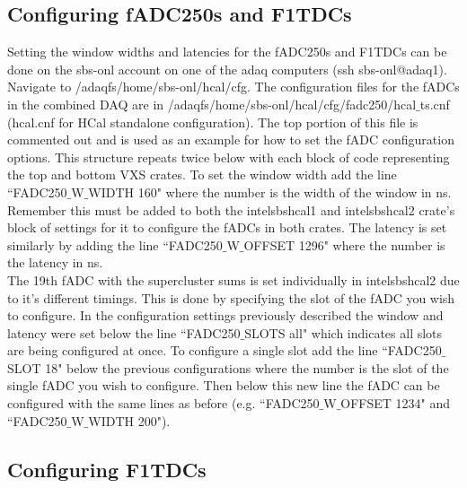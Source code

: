 \documentclass[oneside]{book}   %
\begin{document}
\subsection{Configuring fADC250s and F1TDCs}
\label{ssec:fadc_cfg}

Setting the window widths and latencies for the fADC250s and F1TDCs can be done on the sbs-onl account on one of the adaq computers (ssh sbs-onl@adaq1). Navigate to /adaqfs/home/sbs-onl/hcal/cfg. The configuration files for the fADCs in the combined DAQ are in /adaqfs/home/sbs-onl/hcal/cfg/fadc250/hcal$\_$ts.cnf (hcal.cnf for HCal standalone configuration). The top portion of this file is commented out and is used as an example for how to set the fADC configuration options. This structure repeats twice below with each block of code representing the top and bottom VXS crates. To set the window width add the line ``FADC250$\_$W$\_$WIDTH 160" where the number is the width of the window in ns. Remember this must be added to both the intelsbshcal1 and intelsbshcal2 crate's block of settings for it to configure the fADCs in both crates. The latency is set similarly by adding the line ``FADC250$\_$W$\_$OFFSET 1296" where the number is the latency in ns. \\

The 19th fADC with the supercluster sums is set individually in intelsbshcal2 due to it's different timings. This is done by specifying the slot of the fADC you wish to configure. In the configuration settings previously described the window and latency were set below the line ``FADC250$\_$SLOTS all" which indicates all slots are being configured at once. To configure a single slot add the line ``FADC250$\_$SLOT 18" below the previous configurations where the number is the slot of the single fADC you wish to configure. Then below this new line the fADC can be configured with the same lines as before (e.g. ``FADC250$\_$W$\_$OFFSET 1234" and ``FADC250$\_$W$\_$WIDTH 200"). \\  

\subsection{Configuring F1TDCs}
\label{ssec:f1tdc_cfg}
\end{document}
